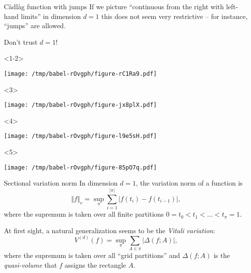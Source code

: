 \documentclass[smaller]{beamer}\usepackage{listings}
\begin{document}
\begin{frame}[label={sec:orgd741d85}]{Càdlàg function with jumps}
If we picture ``continuous from the right with left-hand limits'' in dimension
\(d=1\) this does not seem very restrictive -- for instance, ``jumps'' are allowed.\pause

\begin{alertblock}{\center Don't trust \(d=1\)!}
\end{alertblock}

\begin{onlyenv}<1-2>
\begin{center}
\texttt{[image: /tmp/babel-rOvgph/figure-rC1Ra9.pdf]}
\end{center}
\end{onlyenv}


\begin{onlyenv}<3>
\begin{center}
\texttt{[image: /tmp/babel-rOvgph/figure-jx8plX.pdf]}
\end{center}
\end{onlyenv}

\begin{onlyenv}<4>
\begin{center}
\texttt{[image: /tmp/babel-rOvgph/figure-l9e5sH.pdf]}
\end{center}
\end{onlyenv}

\begin{onlyenv}<5>
\begin{center}
\texttt{[image: /tmp/babel-rOvgph/figure-85pO7q.pdf]}
\end{center}
\end{onlyenv}
\end{frame}

\begin{frame}[label={sec:org45c949e}]{Sectional variation norm}
\pause
In dimension $d=1$, the variation norm of a function is
\begin{equation*}
  \Vert f \Vert_{v} = \sup_{\pi} \sum_{i=1}^{|\pi|} |f(t_{i})-f(t_{i-1})|,
\end{equation*}
where the supremum is taken over all finite partitions
\(0=t_0 < t_1 < \dots < t_{\pi} = 1\).

\vfill \pause

At first sight, a natural generalization seems to be the \emph{Vitali variation}:
\begin{equation*}
  V^{(d)}(f) = \sup_{\pi} \sum_{A \in \pi} | \Delta(f;A)|,
\end{equation*}
where the supremum is taken over all ``grid partitions'' and \(\Delta(f;A)\) is
the \textit{quasi-volume} that \(f\) assigns the rectangle $A$.
\end{frame}
\end{document}
